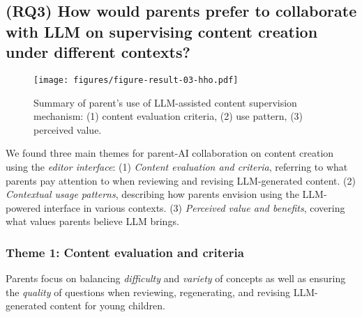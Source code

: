 
\subsection{(RQ3) How would parents prefer to collaborate with LLM on supervising content creation under different contexts?}

\begin{figure*}[b]
\texttt{[image: figures/figure-result-03-hho.pdf]}
   \vspace{-6pt}
  \caption{Summary of parent's use of LLM-assisted content supervision mechanism: (1) content evaluation criteria, (2) use pattern, (3) perceived value.}
  \label{fig:result-03}
   \vspace{-6pt}
\end{figure*}

We found three main themes for parent-AI collaboration on content creation using the \textit{editor interface}: (1) \textit{Content evaluation and criteria}, referring to what parents pay attention to when reviewing and revising LLM-generated content. (2) \textit{Contextual usage patterns}, describing how parents envision using the LLM-powered interface in various contexts. (3) \textit{Perceived value and benefits}, covering what values parents believe LLM brings.

\subsubsection{Theme 1: Content evaluation and criteria}
Parents focus on balancing \textit{difficulty} and \textit{variety} of concepts as well as ensuring the \textit{quality} of questions when reviewing, regenerating, and revising LLM-generated content for young children.


